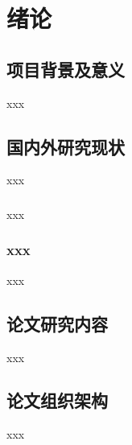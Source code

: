 \cleardoublepage            %
\pagestyle{mainstyle}       %

\section{绪论}
\subsection{项目背景及意义}
xxx

\subsection{国内外研究现状}
xxx

\subsubsection{}
xxx

\subsubsection{xxx}
xxx

\subsection{论文研究内容}
xxx

\subsection{论文组织架构}
xxx

\clearpage        %

